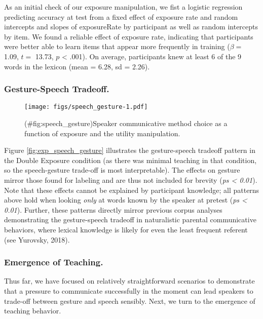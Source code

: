 \documentclass[english,,man,floatsintext]{apa6}
\begin{document}
As an initial check of our exposure manipulation, we fist a logistic regression predicting accuracy at test from a fixed effect of exposure rate and random intercepts and slopes of exposureRate by participant as well as random intercepts by item. We found a reliable effect of exposure rate, indicating that participants were better able to learn items that appear more frequently in training (\(\beta =\) 1.09, \(t =\) 13.73, \(p\) \textless{} .001). On average, participants knew at least 6 of the 9 words in the lexicon (mean = 6.28, sd = 2.26).

\hypertarget{gesture-speech-tradeoff.}{%
\subsubsection{Gesture-Speech Tradeoff.}\label{gesture-speech-tradeoff.}}

\begin{figure}
\centering
\texttt{[image: figs/speech\_gesture-1.pdf]}
\caption{(\#fig:speech\_gesture)Speaker communicative method choice as a function of exposure and the utility manipulation.}
\end{figure}

Figure \ref{fig:exp_speech_gesture} illustrates the gesture-speech tradeoff pattern in the Double Exposure condition (as there was minimal teaching in that condition, so the speech-gesture trade-off is most interpretable). The effects on gesture mirror those found for labeling and are thus not included for brevity (\emph{ps \textless{} 0.01}). Note that these effects cannot be explained by participant knowledge; all patterns above hold when looking \emph{only} at words known by the speaker at pretest (\emph{ps \textless{} 0.01}). Further, these patterns directly mirror previous corpus analyses demonstrating the gesture-speech tradeoff in naturalistic parental communicative behaviors, where lexical knowledge is likely for even the least frequent referent (see Yurovsky, 2018).

\hypertarget{emergence-of-teaching.}{%
\subsubsection{Emergence of Teaching.}\label{emergence-of-teaching.}}

Thus far, we have focused on relatively straightforward scenarios to demonstrate that a pressure to communicate successfully in the moment can lead speakers to trade-off between gesture and speech sensibly. Next, we turn to the emergence of teaching behavior.
\end{document}
